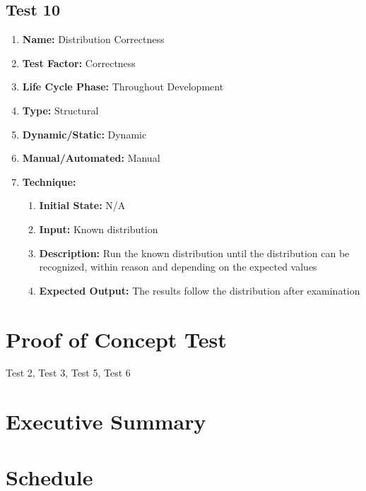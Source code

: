 \documentclass[paper=letter, fontsize=10pt]{scrartcl}
\numberwithin{equation}{section}		%
\numberwithin{figure}{section}			%
\numberwithin{table}{section}				%
\begin{document}
\subsection{Test 10}
\begin{enumerate}[a]
	\item \textbf{Name:} Distribution Correctness
	\item \textbf{Test Factor:} Correctness 
	\item \textbf{Life Cycle Phase:} Throughout Development
	\item \textbf{Type:} Structural
	\item \textbf{Dynamic/Static:} Dynamic
	\item \textbf{Manual/Automated:} Manual
	\item \textbf{Technique:}
		\begin{enumerate}[i]
			\item \textbf{Initial State:} N/A  
			\item \textbf{Input:} Known distribution
			\item \textbf{Description:} Run the known distribution until the distribution can be recognized, within reason and depending on the expected values
			\item \textbf{Expected Output:} The results follow the distribution after examination
		\end{enumerate}
\end{enumerate}

\section{Proof of Concept Test}
	Test 2, Test 3, Test 5, Test 6
\section{Executive Summary}

\section{Schedule}


\end{document}
